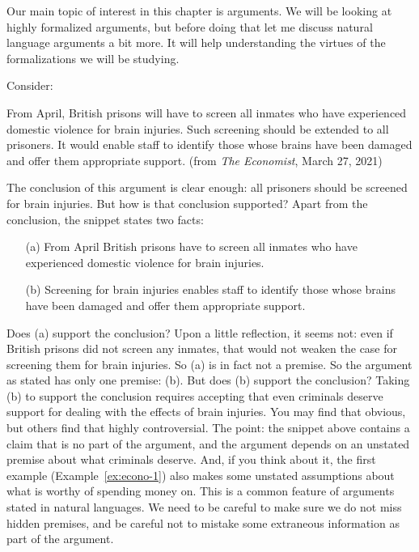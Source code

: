 Our main topic of interest in this chapter is arguments. We will be looking at 
highly formalized arguments, but before doing that let me discuss natural 
language arguments a bit more. It will help understanding the virtues of the 
formalizations we will be studying.

Consider:

\begin{Example}\label{ex:econo-2}


From April, British prisons will have to screen all inmates who have experienced 
domestic violence for brain injuries. Such screening should be extended to all 
prisoners. It would enable staff to identify those whose brains have been 
damaged and offer them appropriate support. (from \emph{The Economist}, March  
27, 2021)

\end{Example}


The conclusion of this argument is clear enough: all prisoners should be 
screened for brain injuries. But how is that conclusion supported? Apart from 
the conclusion, the snippet states two facts:

\begin{itemize}
 \item[(a)] From April British prisons have to screen all inmates who have 
  experienced domestic violence for brain injuries.
 \item[(b)] Screening for brain injuries enables staff to identify those whose 
  brains have been damaged and offer them appropriate support.
\end{itemize}

Does (a) support the conclusion? Upon a little reflection, it seems not: even if 
British prisons did not screen any inmates, that would not weaken the case for 
screening them for brain injuries. So (a) is in fact not a premise. So the 
argument as stated has only one premise: (b). But does (b) support the 
conclusion?  Taking (b) to support the conclusion requires accepting that even 
criminals deserve support for dealing with the effects of brain injuries. You 
may find that obvious, but others find that highly controversial. The point: the 
snippet above contains a claim that is no part of the argument, and the argument 
depends on an unstated premise about what criminals deserve. And, if you think 
about it, the first example (Example~\ref{ex:econo-1}) also makes some unstated 
assumptions about what is worthy of spending money on. This is a common feature 
of arguments stated in natural languages.  We need to be careful to make sure we 
do not miss hidden premises, and be careful not to mistake some extraneous 
information as part of the argument.


